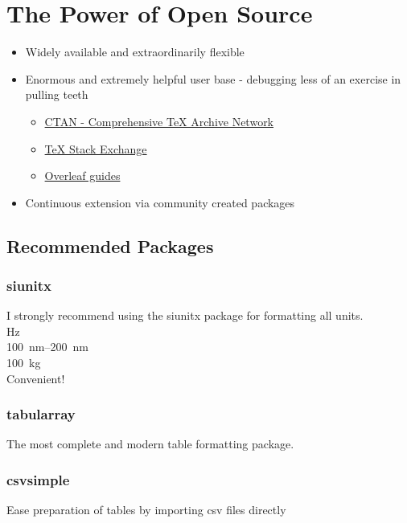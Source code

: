 \documentclass[hidelinks, 12pt]{article}%
\begin{document}
    \section{The Power of Open Source}
        \begin{itemize}
            \item Widely available and extraordinarily flexible
            \item Enormous and extremely helpful user base - debugging less of an exercise in pulling teeth
                \begin{itemize}
                    \item \href{https://www.ctan.org/}{CTAN - Comprehensive TeX Archive Network}
                    \item \href{https://tex.stackexchange.com/}{TeX Stack Exchange}
                    \item \href{https://www.overleaf.com/learn}{Overleaf guides}
                \end{itemize}
            \item Continuous extension via community created packages
        \end{itemize}

        \subsection{Recommended Packages}
        \subsubsection{siunitx}
            I strongly recommend using the siunitx package for formatting all units.
            \\\si{\hertz}
            \\\SIrange{100}{200}{\nano\meter}
            \\\SI{100}{\kilo\gram}
            \\Convenient!

        \subsubsection{tabularray}
            The most complete and modern table formatting package.

        \subsubsection{csvsimple}
            Ease preparation of tables by importing csv files directly
\end{document}
